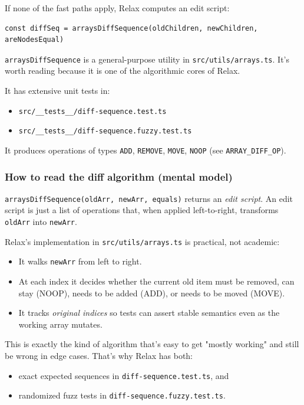 If none of the fast paths apply, Relax computes an edit script:

\begin{verbatim}
const diffSeq = arraysDiffSequence(oldChildren, newChildren, areNodesEqual)
\end{verbatim}



	\texttt{arraysDiffSequence} is a general-purpose utility in \texttt{src/utils/arrays.ts}. It's worth reading because it is one of the algorithmic cores of Relax.

It has extensive unit tests in:

\begin{itemize}
  \item \texttt{src/\_\_tests\_\_/diff-sequence.test.ts}
  \item \texttt{src/\_\_tests\_\_/diff-sequence.fuzzy.test.ts}
\end{itemize}

It produces operations of types \texttt{ADD}, \texttt{REMOVE}, \texttt{MOVE}, \texttt{NOOP} (see \texttt{ARRAY\_DIFF\_OP}).

\subsubsection*{How to read the diff algorithm (mental model)}


	\texttt{arraysDiffSequence(oldArr, newArr, equals)} returns an \emph{edit script}.
An edit script is just a list of operations that, when applied left-to-right, transforms \texttt{oldArr} into \texttt{newArr}.

Relax's implementation in \texttt{src/utils/arrays.ts} is practical, not academic:

\begin{itemize}
  \item It walks \texttt{newArr} from left to right.
  \item At each index it decides whether the current old item must be removed, can stay (NOOP), needs to be added (ADD), or needs to be moved (MOVE).
  \item It tracks \emph{original indices} so tests can assert stable semantics even as the working array mutates.
\end{itemize}

This is exactly the kind of algorithm that's easy to get "mostly working" and still be wrong in edge cases.
That's why Relax has both:

\begin{itemize}
  \item exact expected sequences in \texttt{diff-sequence.test.ts}, and
  \item randomized fuzz tests in \texttt{diff-sequence.fuzzy.test.ts}.
\end{itemize}

